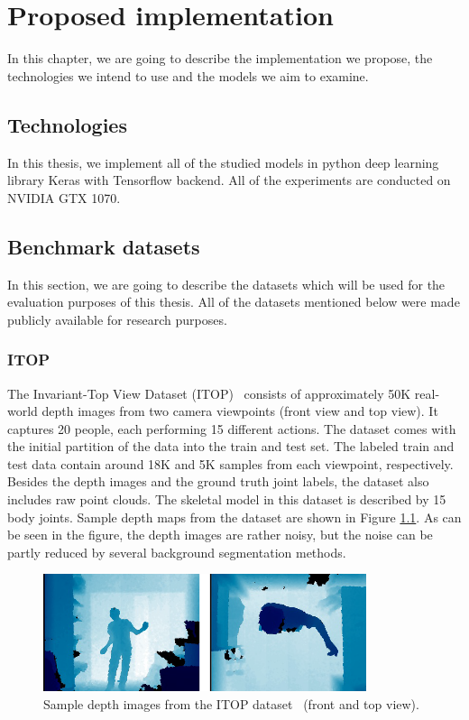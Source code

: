 \chapter{Proposed implementation}\label{chap:proposal}
In this chapter, we are going to describe the implementation we propose, the technologies we intend to use and the models we aim to examine.


\section{Technologies}
In this thesis, we implement all of the studied models in python deep learning library Keras with Tensorflow backend. All of the experiments are conducted on NVIDIA GTX 1070.

\section{Benchmark datasets}

In this section, we are going to describe the datasets which will be used for the evaluation purposes of this thesis. All of the datasets mentioned below were made publicly available for research purposes.
\subsection{ITOP}
The Invariant-Top View Dataset (ITOP)~\cite{haque2016viewpoint} consists of approximately 50K real-world depth images from two camera viewpoints (front view and top view). It captures 20 people, each performing 15 different actions. The dataset comes with the initial partition of the data into the train and test set. The labeled train and test data contain around 18K and 5K samples from each viewpoint, respectively. Besides the depth images and the ground truth joint labels, the dataset also includes raw point clouds. The skeletal model in this dataset is described by 15 body joints. Sample depth maps from the dataset are shown in Figure \ref{fig:itop}. As can be seen in the figure, the depth images are rather noisy, but the noise can be partly reduced by several background segmentation methods.\par

\vspace{5mm}
\begin{figure}[H]
\begin{center}
  \includegraphics[height=130px]{images/implementation/itop.png}
  \caption[Sample depth images from the ITOP dataset.]{Sample depth images from the ITOP dataset~\cite{haque2016viewpoint} (front and top view).}
  \label{fig:itop}
\end{center}
\end{figure}

